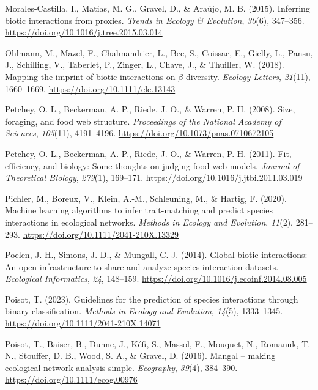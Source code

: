 \documentclass[
]{article}
\newlength{\cslhangindent}
\newenvironment{CSLReferences}[2] %
 {\begin{list}{}{%
  \setlength{\itemindent}{0pt}
  \setlength{\leftmargin}{0pt}
  \setlength{\parsep}{0pt}
  \ifodd #1
   \setlength{\leftmargin}{\cslhangindent}
   \setlength{\itemindent}{-1\cslhangindent}
  \fi
  \setlength{\itemsep}{#2\baselineskip}}}
 {\end{list}}
\begin{document}
\begin{CSLReferences}{1}{0}
Morales-Castilla, I., Matias, M. G., Gravel, D., \& Araújo, M. B.
(2015). Inferring biotic interactions from proxies. \emph{Trends in
Ecology \& Evolution}, \emph{30}(6), 347--356.
\url{https://doi.org/10.1016/j.tree.2015.03.014}

Ohlmann, M., Mazel, F., Chalmandrier, L., Bec, S., Coissac, E., Gielly,
L., Pansu, J., Schilling, V., Taberlet, P., Zinger, L., Chave, J., \&
Thuiller, W. (2018). Mapping the imprint of biotic interactions on
{\(\beta\)}-diversity. \emph{Ecology Letters}, \emph{21}(11),
1660--1669. \url{https://doi.org/10.1111/ele.13143}

Petchey, O. L., Beckerman, A. P., Riede, J. O., \& Warren, P. H. (2008).
Size, foraging, and food web structure. \emph{Proceedings of the
National Academy of Sciences}, \emph{105}(11), 4191--4196.
\url{https://doi.org/10.1073/pnas.0710672105}

Petchey, O. L., Beckerman, A. P., Riede, J. O., \& Warren, P. H. (2011).
Fit, efficiency, and biology: {Some} thoughts on judging food web
models. \emph{Journal of Theoretical Biology}, \emph{279}(1), 169--171.
\url{https://doi.org/10.1016/j.jtbi.2011.03.019}

Pichler, M., Boreux, V., Klein, A.-M., Schleuning, M., \& Hartig, F.
(2020). Machine learning algorithms to infer trait-matching and predict
species interactions in ecological networks. \emph{Methods in Ecology
and Evolution}, \emph{11}(2), 281--293.
\url{https://doi.org/10.1111/2041-210X.13329}

Poelen, J. H., Simons, J. D., \& Mungall, C. J. (2014). Global biotic
interactions: {An} open infrastructure to share and analyze
species-interaction datasets. \emph{Ecological Informatics}, \emph{24},
148--159. \url{https://doi.org/10.1016/j.ecoinf.2014.08.005}

Poisot, T. (2023). Guidelines for the prediction of species interactions
through binary classification. \emph{Methods in Ecology and Evolution},
\emph{14}(5), 1333--1345. \url{https://doi.org/10.1111/2041-210X.14071}

Poisot, T., Baiser, B., Dunne, J., Kéfi, S., Massol, F., Mouquet, N.,
Romanuk, T. N., Stouffer, D. B., Wood, S. A., \& Gravel, D. (2016).
Mangal -- making ecological network analysis simple. \emph{Ecography},
\emph{39}(4), 384--390. \url{https://doi.org/10.1111/ecog.00976}


\end{CSLReferences}
\end{document}
